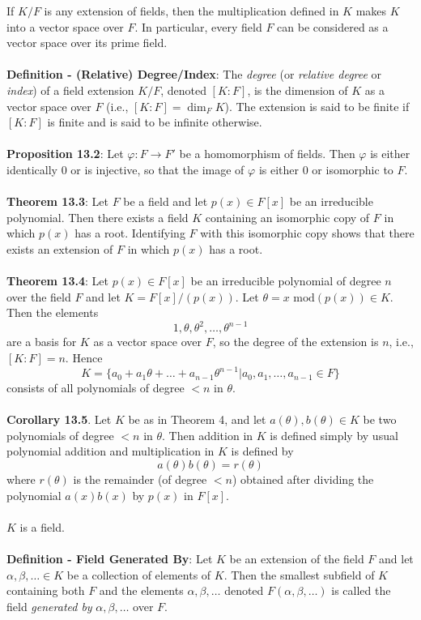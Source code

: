 \documentclass{article}
\begin{document}
If $K/F$ is any extension of fields, then the multiplication defined in $K$ makes $K$ into a vector space over $F$. In particular, every field $F$ can be considered as a vector
space over its prime field. \\ \\
\textbf{Definition - (Relative) Degree/Index}: The \textit{degree} (or \textit{relative degree} or \textit{index}) of a field extension $K/F$, denoted
$[K : F]$, is the dimension of $K$ as a vector space over $F$ (i.e., $[K : F] = \dim_F K$). The extension is said to be finite if $[K : F]$ is finite and is said to be infinite otherwise. \\ \\
\textbf{Proposition 13.2}: Let $\varphi: F \rightarrow F'$ be a homomorphism of fields. Then $\varphi$ is either identically $0$ or is injective, so that the image of $\varphi$ is either $0$ or isomorphic to $F$. \\ \\
\textbf{Theorem 13.3}: Let $F$ be a field and let $p(x) \in F[x]$ be an irreducible polynomial. Then there exists a field $K$ containing an isomorphic copy of $F$ in which $p(x)$ has a root. Identifying $F$ with this isomorphic copy shows that there exists an extension of $F$ in which $p(x)$ has a root. \\ \\
\textbf{Theorem 13.4}: Let $p(x) \in F[x]$ be an irreducible polynomial of degree $n$ over the field $F$ and let $K = F[x]/(p(x))$. Let $\theta = x \text{ mod} (p(x)) \in K$. Then the elements $$1, \theta, \theta^2, \dots, \theta^{n - 1}$$ are a basis for $K$ as a vector space over $F$, so the degree of the extension is $n$, i.e., $[K : F] = n$. Hence $$K = \{a_0 + a_1\theta + \dots + a_{n - 1}\theta^{n - 1}|a_0, a_1, \dots, a_{n - 1} \in F\}$$ consists of all polynomials of degree $< n$ in $\theta$. \\ \\
\textbf{Corollary 13.5}. Let $K$ be as in Theorem 4, and let $a(\theta), b(\theta) \in K$ be two polynomials of degree $< n$ in $\theta$. Then addition in $K$ is defined simply by usual polynomial addition and multiplication in $K$ is defined by $$a(\theta)b(\theta) = r(\theta)$$ where $r(\theta)$ is the remainder (of degree $< n$) obtained after dividing the polynomial $a(x)b(x)$ by $p(x)$ in $F[x]$. \\ \\
$K$ is a field. \\ \\
\textbf{Definition - Field Generated By}: Let $K$ be an extension of the field $F$ and let $\alpha, \beta, \dots \in K$ be a collection of elements of $K$. Then the smallest subfield of $K$ containing both $F$ and the elements $\alpha, \beta, \dots$ denoted $F(\alpha, \beta, \dots)$ is called the field \textit{generated by} $\alpha, \beta, \dots$ over $F$. \\ \\
\end{document}
